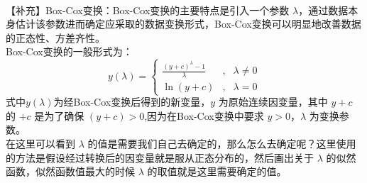\documentclass[11pt]{ctexart}
\begin{document}
    \begin{center}
    \end{center}
    { \hspace*{\fill} \\}
    
    【补充】Box-Cox变换：Box-Cox变换的主要特点是引入一个参数
\(\lambda\)，通过数据本身估计该参数进而确定应采取的数据变换形式，Box-Cox变换可以明显地改善数据的正态性、方差齐性。\\
Box-Cox变换的一般形式为：\\
\[ y(\lambda)=\left\{
\begin{aligned}
\frac{(y+c)^{\lambda}-1}{\lambda} & ,&\lambda \neq 0 \\
\ln (y+c) & ,& \lambda = 0 
\end{aligned}
\right.
\] 式中\(y(\lambda)\)为经Box-Cox变换后得到的新变量，\(y\)
为原始连续因变量，其中 \(y+c\) 的 \(+c\) 是为了确保
\((y+c)>0\),因为在Box-Cox变换中要求 \(y>0\)，\(\lambda\) 为变换参数。\\
在这里可以看到 \(\lambda\)
的值是需要我们自己去确定的，那么怎么去确定呢？这里使用的方法是假设经过转换后的因变量就是服从正态分布的，然后画出关于
\(\lambda\) 的似然函数，似然函数值最大的时候 \(\lambda\)
的取值就是这里需要确定的值。
\end{document}
